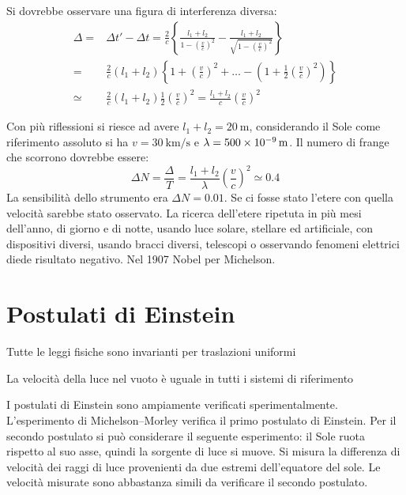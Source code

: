 \parbox[]{\textwidth}{
   Si dovrebbe osservare una figura di interferenza diversa:
   \begin{align*}
      \Delta= & \Delta t'-\Delta t=\frac{2}{c}\left\{\frac{l_1+l_2}{{1-\left(\frac{v}{c}\right)^2}}-\frac{l_1+l_2}{\sqrt{1-\left(\frac{v}{c}\right)^2}}\right\} \\
      =       & \frac{2}{c}(l_1+l_2)\left\{1+\left(\frac{v}{c}\right)^2+\ldots-\left(1+\frac{1}{2}\left(\frac{v}{c}\right)^2\right)\right\}                     \\
      \simeq  & \frac{2}{c}(l_1+l_2)\frac{1}{2}\left(\frac{v}{c}\right)^2=\frac{l_1+l_2}{c}\left(\frac{v}{c}\right)^2\end{align*}
}
Con più riflessioni si riesce ad avere $l_1+l_2=\SI{20}{\metre}$, considerando il Sole come riferimento assoluto si ha $v=\SI{30}{\kilo\meter\per\second}$ e $\lambda=\SI{500E-9}{\metre}$.
Il numero di frange che scorrono dovrebbe essere:
\[\Delta N=\frac{\Delta}{T}=\frac{l_1+l_2}{\lambda}\left(\frac{v}{c}\right)^2\simeq 0.4\]
La sensibilità dello strumento era $\Delta N=0.01$. Se ci fosse stato l'etere con quella velocità sarebbe stato osservato. La ricerca dell'etere ripetuta in più mesi dell'anno, di giorno e di notte, usando luce solare, stellare ed artificiale, con dispositivi diversi, usando bracci diversi, telescopi o osservando fenomeni elettrici diede risultato negativo. Nel 1907 Nobel per Michelson.
\section{Postulati di Einstein}
\begin{post}
   Tutte le leggi fisiche sono invarianti per traslazioni uniformi
\end{post}
\begin{post}
   La velocità della luce nel vuoto è uguale in tutti i sistemi di riferimento
\end{post}

I postulati di Einstein sono ampiamente verificati sperimentalmente. L'esperimento di Michelson--Morley verifica il primo postulato di Einstein. Per il secondo postulato si può considerare il seguente esperimento: il Sole ruota rispetto al suo asse, quindi la sorgente di luce si muove. Si misura la differenza di velocità dei raggi di luce provenienti da due estremi dell'equatore del sole. Le velocità misurate sono abbastanza simili da verificare il secondo postulato.

